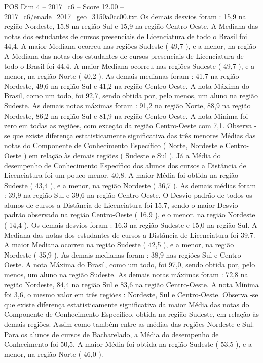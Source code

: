 \begin{textsample}{POS Dim 4 – 2017\_c6 – Score 12.00 – 2017\_c6/enade\_2017\_geo\_3150a0cc00.txt}
Os demais desvios foram : 15,9 na região Nordeste, 15,8 na região Sul e 15,9 na região Centro-Oeste.
A Mediana das notas dos estudantes de cursos presenciais de Licenciatura de todo o Brasil foi 44,4.
A maior Mediana ocorreu nas regiões Sudeste ( 49,7 ), e a menor, na região A Mediana das notas dos estudantes de cursos presenciais de Licenciatura de todo o Brasil foi 44,4.
A maior Mediana ocorreu nas regiões Sudeste ( 49,7 ), e a menor, na região Norte ( 40,2 ).
As demais medianas foram : 41,7 na região Nordeste, 49,6 na região Sul e 41,2 na região Centro-Oeste.
A nota Máxima do Brasil, como um todo, foi 92,7, sendo obtida por, pelo menos, um aluno na região Sudeste.
As demais notas máximas foram : 91,2 na região Norte, 88,9 na região Nordeste, 86,2 na região Sul e 81,9 na região Centro-Oeste.
A nota Mínima foi zero em todas as regiões, com exceção da região Centro-Oeste com 7,1.
Observa -se que existe diferença estatisticamente significativa das três menores Médias das notas do Componente de Conhecimento Específico ( Norte, Nordeste e Centro-Oeste ) em relação às demais regiões ( Sudeste e Sul ).
Já a Média do desempenho de Conhecimento Específico dos alunos dos cursos a Distância de Licenciatura foi um pouco menor, 40,8.
A maior Média foi obtida na região Sudeste ( 43,4 ), e a menor, na região Nordeste ( 36,7 ).
As demais médias foram : 39,9 na região Sul e 39,6 na região Centro-Oeste.
O Desvio padrão de todos os alunos de cursos a Distância de Licenciatura foi 15,7, sendo o maior Desvio padrão observado na região Centro-Oeste ( 16,9 ), e o menor, na região Nordeste ( 14,4 ).
Os demais desvios foram : 16,3 na região Sudeste e 15,0 na região Sul.
A Mediana das notas dos estudantes de cursos a Distância de Licenciatura foi 39,7.
A maior Mediana ocorreu na região Sudeste ( 42,5 ), e a menor, na região Nordeste ( 35,9 ).
As demais medianas foram : 38,9 nas regiões Sul e Centro-Oeste.
A nota Máxima do Brasil, como um todo, foi 97,0, sendo obtida por, pelo menos, um aluno na região Sudeste.
As demais notas máximas foram : 72,8 na região Nordeste, 84,4 na região Sul e 83,6 na região Centro-Oeste.
A nota Mínima foi 3,6, o mesmo valor em três regiões : Nordeste, Sul e Centro-Oeste.
Observa -se que existe diferença estatisticamente significativa da maior Média das notas do Componente de Conhecimento Específico, obtida na região Sudeste, em relação às demais regiões.
Assim como também entre as médias das regiões Nordeste e Sul.
Para os alunos de cursos de Bacharelado, a Média do desempenho de Conhecimento foi 50,5.
A maior Média foi obtida na região Sudeste ( 53,5 ), e a menor, na região Norte ( 46,0 ).

\end{textsample}
